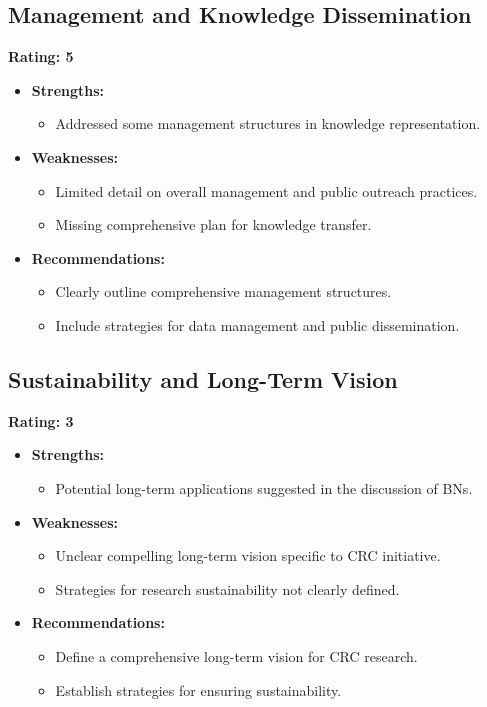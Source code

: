 \documentclass{article}
\begin{document}
\subsection{Management and Knowledge Dissemination}

\textbf{Rating: 5}

\begin{itemize}
    \item \textbf{Strengths:}
    \begin{itemize}
        \item Addressed some management structures in knowledge representation.
    \end{itemize}
    \item \textbf{Weaknesses:}
    \begin{itemize}
        \item Limited detail on overall management and public outreach practices.
        \item Missing comprehensive plan for knowledge transfer.
    \end{itemize}
    \item \textbf{Recommendations:}
    \begin{itemize}
        \item Clearly outline comprehensive management structures.
        \item Include strategies for data management and public dissemination.
    \end{itemize}
\end{itemize}

\subsection{Sustainability and Long-Term Vision}

\textbf{Rating: 3}

\begin{itemize}
    \item \textbf{Strengths:}
    \begin{itemize}
        \item Potential long-term applications suggested in the discussion of BNs.
    \end{itemize}
    \item \textbf{Weaknesses:}
    \begin{itemize}
        \item Unclear compelling long-term vision specific to CRC initiative.
        \item Strategies for research sustainability not clearly defined.
    \end{itemize}
    \item \textbf{Recommendations:}
    \begin{itemize}
        \item Define a comprehensive long-term vision for CRC research.
        \item Establish strategies for ensuring sustainability.
    \end{itemize}
\end{itemize}
\end{document}
